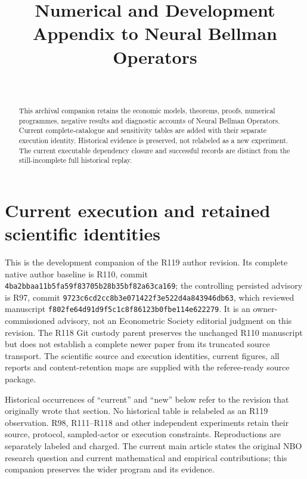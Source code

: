 \documentclass[ecta,nameyear,draft]{econsocart}
\begin{document}
\begin{frontmatter}
\title{Numerical and Development Appendix to Neural Bellman Operators}
\begin{aug}
\author[id=au1,addressref={add1}]{~}
\address[id=add1]{Peking University}
\end{aug}
\begin{abstract}This archival companion retains the economic models, theorems, proofs, numerical programmes, negative results and diagnostic accounts of Neural Bellman Operators. Current complete-catalogue and sensitivity tables are added with their separate execution identity. Historical evidence is preserved, not relabeled as a new experiment. The current executable dependency closure and successful records are distinct from the still-incomplete full historical replay.\end{abstract}
\end{frontmatter}
\appendix
\renewcommand{\thetheorem}{A.\arabic{theorem}}
\renewcommand{\theequation}{A.\arabic{equation}}
\renewcommand{\thesection}{\AlphAlph{\value{section}}}
\section{Current execution and retained scientific identities}\label{dev:custody119}
This is the development companion of the R119 author revision. Its complete
native author baseline is R110, commit
\nolinkurl{4ba2bbaa11b5fa59f83705b28b35bf82a63ca169}; the controlling persisted
advisory is R97, commit \nolinkurl{9723c6cd2cc8b3e071422f3e522d4a843946db63},
which reviewed manuscript \nolinkurl{f802fe64d91d9f5c1c8f86123b0fbe114e622279}.
It is an owner-commissioned advisory, not an Econometric Society editorial
judgment on this revision. The R118 Git custody parent preserves the unchanged
R110 manuscript but does not establish a complete newer paper from its
truncated source transport. The scientific source and execution identities,
current figures, all reports and content-retention maps are supplied with the
referee-ready source package.

Historical occurrences of ``current'' and ``new'' below refer to the revision
that originally wrote that section. No historical table is relabeled as an
R119 observation. R98, R111--R118 and other independent experiments retain
their source, protocol, sampled-actor or execution constraints. Reproductions
are separately labeled and charged. The current main article states the
original NBO research question and current mathematical and empirical
contributions; this companion preserves the wider program and its evidence.
\end{document}
